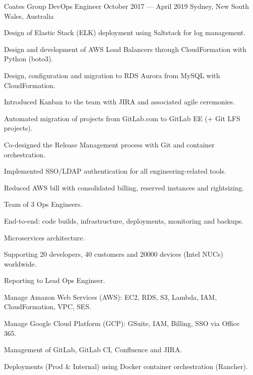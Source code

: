\begin{experiences}
  \expitem
  {Coates Group} %
  {DevOps Engineer} %
  {October 2017 --- April 2019} %
  {Sydney, New South Wales, Australia} %
  {
    \begin{cvitems}
      \item {Design of Elastic Stack (ELK) deployment using Saltstack for log management.}
      \item {Design and development of AWS Load Balancers through CloudFormation with Python (boto3).}
      \item {Design, configuration and migration to RDS Aurora from MySQL with CloudFormation.}
      \item {Introduced Kanban to the team with JIRA and associated agile ceremonies.}
      \item {Automated migration of projects from GitLab.com to GitLab EE (+ Git LFS projects).}
      \item {Co-designed the Release Management process with Git and container orchestration.}
      \item {Implemented SSO/LDAP authentication for all engineering-related tools.}
      \item {Reduced AWS bill with consolidated billing, reserved instances and rightsizing.}
    \end{cvitems}
  }
  {
    \begin{cvitems}
      \item {Team of 3 Ops Engineers.}
      \item {End-to-end: code builds, infrastructure, deployments, monitoring and backups.}
      \item {Microservices architecture.}
      \item {Supporting 20 developers, 40 customers and 20000 devices (Intel NUCs) worldwide.}
      \item {Reporting to Lead Ops Engineer.}
    \end{cvitems}
  }
  {
    \begin{cvitems}
      \item {Manage Amazon Web Services (AWS): EC2, RDS, S3, Lambda, IAM, CloudFormation, VPC, SES.}
      \item {Manage Google Cloud Platform (GCP): GSuite, IAM, Billing, SSO via Office 365.}
      \item {Management of GitLab, GitLab CI, Confluence and JIRA.}
      \item {Deployments (Prod \& Internal) using Docker container orchestration (Rancher).}

\end{cvitems}}
\end{experiences}
